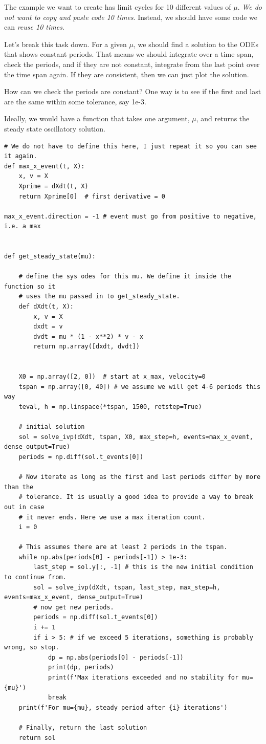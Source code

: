 \documentclass[11pt]{article}
\begin{document}
The example we want to create has limit cycles for 10 different values of \(\mu\). \emph{We do not want to copy and paste code 10 times}. Instead, we should have some code we can \emph{reuse 10 times}.

Let's break this task down. For a given \(\mu\), we should find a solution to the ODEs that shows constant periods. That means we should integrate over a time span, check the periods, and if they are not constant, integrate from the last point over the time span again. If they are consistent, then we can just plot the solution.

How can we check the periods are constant? One way is to see if the first and last are the same within some tolerance, say 1e-3.

Ideally, we would have a function that takes one argument, \(\mu\), and returns the steady state oscillatory solution.

\begin{verbatim}
# We do not have to define this here, I just repeat it so you can see it again.
def max_x_event(t, X):
    x, v = X
    Xprime = dXdt(t, X)
    return Xprime[0]  # first derivative = 0

max_x_event.direction = -1 # event must go from positive to negative, i.e. a max


def get_steady_state(mu):

    # define the sys odes for this mu. We define it inside the function so it
    # uses the mu passed in to get_steady_state.
    def dXdt(t, X):
        x, v = X
        dxdt = v
        dvdt = mu * (1 - x**2) * v - x
        return np.array([dxdt, dvdt])


    X0 = np.array([2, 0])  # start at x_max, velocity=0
    tspan = np.array([0, 40]) # we assume we will get 4-6 periods this way
    teval, h = np.linspace(*tspan, 1500, retstep=True)

    # initial solution
    sol = solve_ivp(dXdt, tspan, X0, max_step=h, events=max_x_event, dense_output=True)
    periods = np.diff(sol.t_events[0])

    # Now iterate as long as the first and last periods differ by more than the
    # tolerance. It is usually a good idea to provide a way to break out in case
    # it never ends. Here we use a max iteration count.
    i = 0

    # This assumes there are at least 2 periods in the tspan.
    while np.abs(periods[0] - periods[-1]) > 1e-3:
        last_step = sol.y[:, -1] # this is the new initial condition to continue from.
        sol = solve_ivp(dXdt, tspan, last_step, max_step=h, events=max_x_event, dense_output=True)
        # now get new periods.
        periods = np.diff(sol.t_events[0])
        i += 1
        if i > 5: # if we exceed 5 iterations, something is probably wrong, so stop.
            dp = np.abs(periods[0] - periods[-1])
            print(dp, periods)
            print(f'Max iterations exceeded and no stability for mu={mu}')
            break
    print(f'For mu={mu}, steady period after {i} iterations')

    # Finally, return the last solution
    return sol
\end{verbatim}
\end{document}
